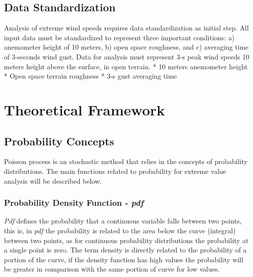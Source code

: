 \documentclass[12pt,oneside]{reedthesis}
\begin{document}
\hypertarget{data-standardization}{%
\section{Data Standardization}\label{data-standardization}}

Analysis of extreme wind speeds requires data standardization as initial step. All input data must be standardized to represent three important conditions: a) anemometer height of 10 meters, b) open space roughness, and c) averaging time of 3-seconds wind gust. Data for analysis must represent 3-s peak wind speeds 10 meters height above the surface, in open terrain.
* 10 meters anemometer height
* Open space terrain roughness
* 3-s gust averaging time

\clearpage

\hypertarget{rmd-thefra}{%
\chapter{Theoretical Framework}\label{rmd-thefra}}

\hypertarget{probability-concepts}{%
\section{Probability Concepts}\label{probability-concepts}}

Poisson process is an stochastic method that relies in the concepts of probability distributions. The main functions related to probability for extreme value analysis will be described below.

\hypertarget{probability-density-function---pdf}{%
\subsection{\texorpdfstring{Probability Density Function - \emph{pdf}}{Probability Density Function - pdf}}\label{probability-density-function---pdf}}

\emph{Pdf} defines the probability that a continuous variable falls between two points, this is, in \emph{pdf} the probability is related to the area below the curve (integral) between two points, as for continuous probability distributions the probability at a single point is zero. The term density is directly related to the probability of a portion of the curve, if the density function has high values the probability will be greater in comparison with the same portion of curve for low values.
\end{document}
